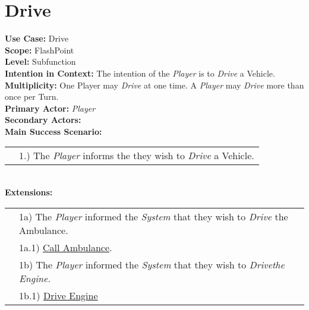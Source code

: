 \documentclass{article}
\begin{document}
	
	\section*{Drive}
	\textbf{Use Case:} Drive\\
	\textbf{Scope:} FlashPoint\\
	\textbf{Level:} Subfunction\\
	\textbf{Intention in Context:} The intention of the \textit{Player} is to \textit{Drive} a Vehicle.\\
	\textbf{Multiplicity: } One Player may \textit{Drive} at one time. A \textit{Player} may \textit{Drive} more than once per Turn.\\
	\textbf{Primary Actor:} \textit{Player}\\
	\textbf{Secondary Actors:}\\
	\textbf{Main Success Scenario:}\\
	\begin{tabular}{l l}
		&1.) The \textit{Player} informs the \text{System} they wish to \textit{Drive} a Vehicle. \\
	\end{tabular}\\
	\textbf{Extensions: } \\
	\begin{tabular}{l l}
		&1a) The \textit{Player} informed the \textit{System} that they wish to \textit{Drive} the Ambulance. \\
		&\qquad1a.1) \underline{Call Ambulance}.\\
		&1b) The \textit{Player} informed the \textit{System} that they wish to \textit{Drivethe Engine.}\\
		&\qquad1b.1) \underline{Drive Engine}\\
	\end{tabular}\\
	
\end{document}
